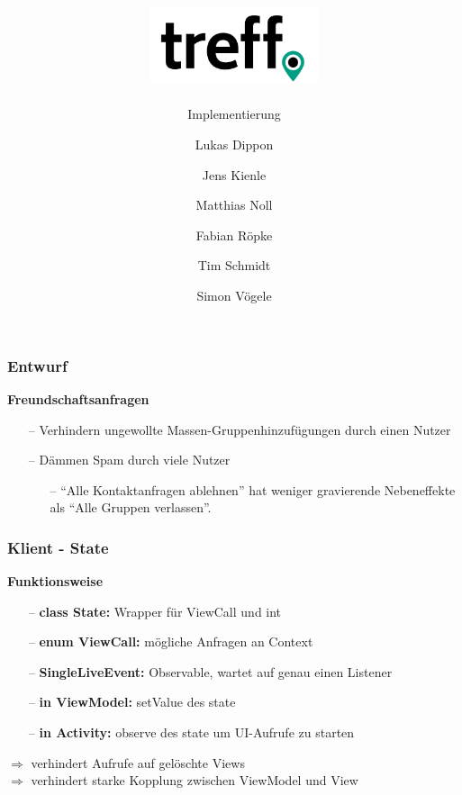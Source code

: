 \documentclass[aspectratio=1610]{beamer}
\title{\includegraphics[width = 50mm]{images/logo_crop.png}}
\subtitle{\huge Implementierung}
\author{Lukas Dippon
	\and Jens Kienle
	\and Matthias Noll
	\and Fabian Röpke
	\and Tim Schmidt
	\and Simon Vögele}
\begin{document}
	\begin{frame}[plain]
	\maketitle
	\end{frame}


	\begin{frame}[plain]
		\frametitle{Entwurf}

		\textbf{Freundschaftsanfragen}
		\begin{itemize}
			\setlength\itemsep{0.3em}
            \item[--] Verhindern ungewollte Massen-Gruppenhinzufügungen durch
                einen Nutzer
            \item[--] Dämmen Spam durch viele Nutzer
                \begin{itemize}
                    \item[--] \enquote{Alle Kontaktanfragen ablehnen} hat
                        weniger gravierende Nebeneffekte als \enquote{Alle
                        Gruppen verlassen}.
                \end{itemize}
		\end{itemize}

	\end{frame}


	\begin{frame}[plain]
		\frametitle{Klient - State}
		\textbf{Funktionsweise}
		\begin{itemize}
			\setlength\itemsep{0.3em}
			\item[--] \textbf{class State:} Wrapper für ViewCall und int
			\item[--] \textbf{enum ViewCall:} mögliche Anfragen an Context
			\item[--] \textbf{SingleLiveEvent:} Observable, wartet auf
			genau einen Listener
			\item[--] \textbf{in ViewModel:} setValue des state
			\item[--] \textbf{in Activity:} observe des state um UI-Aufrufe
			zu starten
		\end{itemize}
	$\Rightarrow$ verhindert Aufrufe auf gelöschte Views \\
	$\Rightarrow$ verhindert starke Kopplung zwischen ViewModel und View
	\end{frame}
\end{document}
